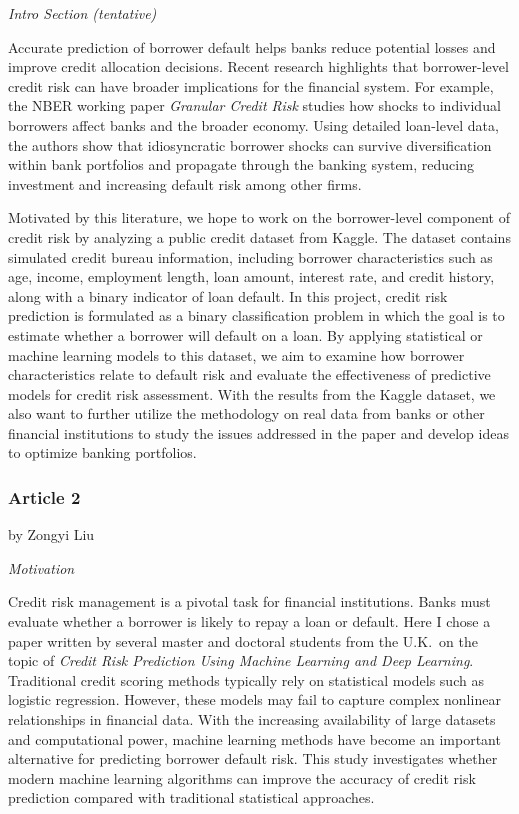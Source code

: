 \documentclass[letterpaper]{article}
\begin{document}
		\medskip
		
		\textit{Intro Section (tentative)}
		
		Accurate prediction of borrower default helps banks reduce potential losses and improve credit allocation decisions. Recent research highlights that borrower-level credit risk can have broader implications for the financial system. For example, the NBER working paper \textit{Granular Credit Risk} studies how shocks to individual borrowers affect banks and the broader economy. Using detailed loan-level data, the authors show that idiosyncratic borrower shocks can survive diversification within bank portfolios and propagate through the banking system, reducing investment and increasing default risk among other firms.
		
		Motivated by this literature, we hope to work on the borrower-level component of credit risk by analyzing a public credit dataset from Kaggle. The dataset contains simulated credit bureau information, including borrower characteristics such as age, income, employment length, loan amount, interest rate, and credit history, along with a binary indicator of loan default. In this project, credit risk prediction is formulated as a binary classification problem in which the goal is to estimate whether a borrower will default on a loan. By applying statistical or machine learning models to this dataset, we aim to examine how borrower characteristics relate to default risk and evaluate the effectiveness of predictive models for credit risk assessment. With the results from the Kaggle dataset, we also want to further utilize the methodology on real data from banks or other financial institutions to study the issues addressed in the paper and develop ideas to optimize banking portfolios.
		
		
		\subsubsection{Article 2}
		
		{\color{deepred} by Zongyi Liu}
		
		
		\textit{Motivation}
		
		Credit risk management is a pivotal task for financial institutions. Banks must evaluate whether a borrower is likely to repay a loan or default. Here I chose a paper written by several master and doctoral students from the U.K.\ on the topic of \textit{Credit Risk Prediction Using Machine Learning and Deep Learning}. Traditional credit scoring methods typically rely on statistical models such as logistic regression. However, these models may fail to capture complex nonlinear relationships in financial data. With the increasing availability of large datasets and computational power, machine learning methods have become an important alternative for predicting borrower default risk. This study investigates whether modern machine learning algorithms can improve the accuracy of credit risk prediction compared with traditional statistical approaches.
		
\end{document}
